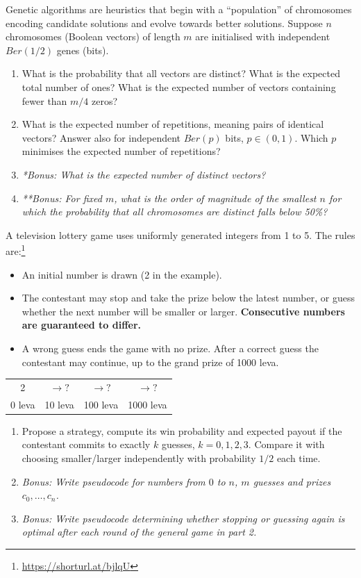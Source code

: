 \documentclass[a4paper]{report}
\begin{document}
\begin{problempencil}[T1, SE 2023]
Genetic algorithms are heuristics that begin with a ``population'' of chromosomes encoding candidate solutions and evolve towards better solutions. Suppose $n$ chromosomes (Boolean vectors) of length $m$ are initialised with independent $Ber(1/2)$ genes (bits).
\begin{enumerate}
\item What is the probability that all vectors are distinct? What is the expected total number of ones? What is the expected number of vectors containing fewer than $m/4$ zeros?
\item What is the expected number of repetitions, meaning pairs of identical vectors? Answer also for independent $Ber(p)$ bits, $p\in(0,1)$. Which $p$ minimises the expected number of repetitions?
\item \textit{*Bonus: What is the expected number of distinct vectors?}
\item \textit{**Bonus: For fixed $m$, what is the order of magnitude of the smallest $n$ for which the probability that all chromosomes are distinct falls below 50\%?}
\end{enumerate}
\end{problempencil}
\begin{problempencil}[T1, SE 2023]
A television lottery game uses uniformly generated integers from 1 to 5. The rules are:\footnote{\url{https://shorturl.at/bjlqU}}
\begin{itemize}
\item An initial number is drawn (2 in the example).
\item The contestant may stop and take the prize below the latest number, or guess whether the next number will be smaller or larger. \textbf{Consecutive numbers are guaranteed to differ.}
\item A wrong guess ends the game with no prize. After a correct guess the contestant may continue, up to the grand prize of 1000 leva.
\end{itemize}
\begin{center}\begin{tabular}{cccc}2&$\longrightarrow ?$&$\longrightarrow ?$&$\longrightarrow ?$\\0 leva&10 leva&100 leva&1000 leva\end{tabular}\end{center}
\begin{enumerate}
\item Propose a strategy, compute its win probability and expected payout if the contestant commits to exactly $k$ guesses, $k=0,1,2,3$. Compare it with choosing smaller/larger independently with probability $1/2$ each time.
\item \textit{Bonus: Write pseudocode for numbers from $0$ to $n$, $m$ guesses and prizes $c_0,\dots,c_n$.}
\item \textit{Bonus: Write pseudocode determining whether stopping or guessing again is optimal after each round of the general game in part 2.}
\end{enumerate}
\end{problempencil}
\end{document}
